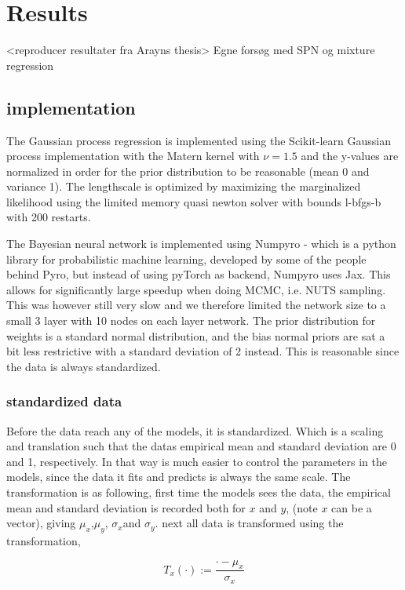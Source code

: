 \chapter{Results}

<reproducer resultater fra Arayns thesis>
Egne forsøg med SPN og mixture regression


\section{implementation}
The Gaussian process regression is implemented using the Scikit-learn Gaussian process
implementation with the Matern kernel with $\nu=1.5$ and the y-values are normalized in order for
the prior distribution to be reasonable (mean 0 and variance 1). The lengthscale is optimized by
maximizing the marginalized likelihood using the limited memory quasi newton solver with bounds
l-bfgs-b with 200 restarts. 

The Bayesian neural network is implemented using Numpyro - which is a python library for
probabilistic machine learning, developed by some of the people behind Pyro, but instead of using
pyTorch as backend, Numpyro uses Jax. This allows for significantly large speedup when doing MCMC,
i.e. NUTS sampling. This was however still very slow and we therefore limited the network size to a
small 3 layer with 10 nodes on each layer network. The prior distribution for weights is a standard
normal distribution, and the bias normal priors are sat 
a bit less restrictive with a standard deviation of 2 instead. 
This is reasonable since the data is always standardized. 

\subsection{standardized data}
Before the data reach any of the models, it is standardized. Which is 
a scaling and translation such that the datas empirical mean and standard deviation are 0 and 1, respectively. 
In that way is much easier to control the parameters in the models, since the data it fits and predicts
is always the same scale. The transformation is as following, first time the models sees the data, 
the empirical mean and standard deviation is recorded both for $x$ and $y$, (note $x$ can be a vector),
giving $\mu_x$,$\mu_y$, $\sigma_x$and $\sigma_y$.
next all data is transformed using the transformation, 

$$T_x(\cdot) := \frac{\cdot-\mu_x}{\sigma_x}$$

